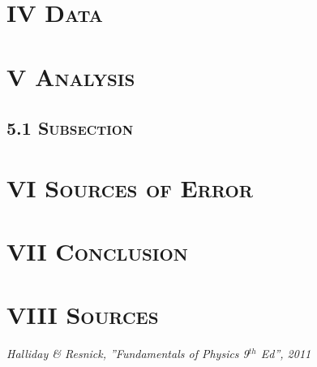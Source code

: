 \documentclass[12pt,twoside]{article}
\begin{document}
\begin{multicols*}{2}
		\section*{\textsc{IV Data}}
		
		\section*{\textsc{V Analysis}}
		\subsection*{\textsc{5.1 Subsection}}	
		
		\section*{\textsc{VI Sources of Error}}
		
		\section*{\textsc{VII Conclusion}}
		
		\section*{\textsc{VIII Sources}}
		\footnotesize
		\textit{Halliday \& Resnick, ”Fundamentals of Physics 9$^{th}$ Ed”, 2011}
	\end{multicols*}
\end{document}
